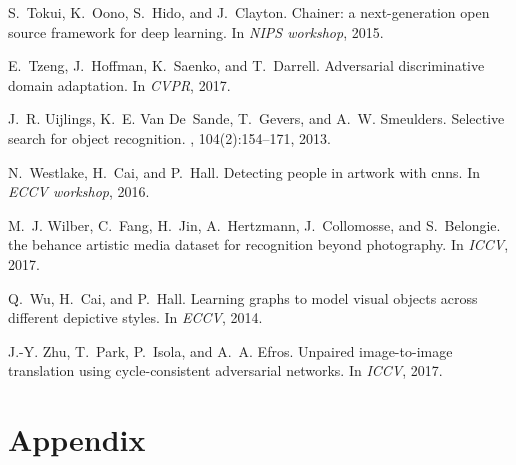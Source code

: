 \documentclass[10pt,twocolumn,letterpaper]{article}
\begin{document}
{\begin{thebibliography}{10}
S.~Tokui, K.~Oono, S.~Hido, and J.~Clayton.
\newblock Chainer: a next-generation open source framework for deep learning.
\newblock In {\em NIPS workshop}, 2015.

E.~Tzeng, J.~Hoffman, K.~Saenko, and T.~Darrell.
\newblock Adversarial discriminative domain adaptation.
\newblock In {\em CVPR}, 2017.

J.~R. Uijlings, K.~E. Van De~Sande, T.~Gevers, and A.~W. Smeulders.
\newblock Selective search for object recognition.
, 104(2):154--171, 2013.

N.~Westlake, H.~Cai, and P.~Hall.
\newblock Detecting people in artwork with cnns.
\newblock In {\em ECCV workshop}, 2016.

M.~J. Wilber, C.~Fang, H.~Jin, A.~Hertzmann, J.~Collomosse, and S.~Belongie.
 the behance artistic media dataset for recognition beyond
  photography.
\newblock In {\em ICCV}, 2017.

Q.~Wu, H.~Cai, and P.~Hall.
\newblock Learning graphs to model visual objects across different depictive
  styles.
\newblock In {\em ECCV}, 2014.

J.-Y. Zhu, T.~Park, P.~Isola, and A.~A. Efros.
\newblock Unpaired image-to-image translation using cycle-consistent
  adversarial networks.
\newblock In {\em ICCV}, 2017.

\end{thebibliography}
}

\appendix
\section*{Appendix}
\end{document}
